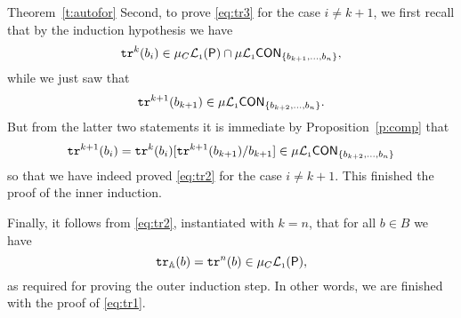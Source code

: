 \begin{proofof}{Theorem~\ref{t:autofor}}
Second, to prove \eqref{eq:tr3} for the case $i \neq k+1$, we first 
recall that by the induction hypothesis we have
\[
\mathtt{tr}^{k}(b_{i}) \in \mu_{C}\mathcal{L}_{\scriptscriptstyle 1}(\mathsf{P}) \cap 
    \mu\mathcal{L}_{\scriptscriptstyle 1}\mathsf{CON}_{\{ b_{k+1},\ldots,b_{n}\}},
\]
while we just saw that 
\[
\mathtt{tr}^{k+1}(b_{k+1}) \in \mu\mathcal{L}_{\scriptscriptstyle 1}\mathsf{CON}_{\{ b_{k+2},\ldots,b_{n}\}}.
\]
But from the latter two statements it is immediate by Proposition~\ref{p:comp} 
that 
\[
\mathtt{tr}^{k+1}(b_{i}) = \mathtt{tr}^{k}(b_{i})[\mathtt{tr}^{k+1}(b_{k+1})/b_{k+1}] 
\in \mu\mathcal{L}_{\scriptscriptstyle 1}\mathsf{CON}_{\{ b_{k+2},\ldots,b_{n}\}}
\]
so that we have indeed proved \eqref{eq:tr2} for the case $i \neq 
k+1$.
This finished the proof of the inner induction.

Finally, it follows from \eqref{eq:tr2}, instantiated with $k = n$, 
that for all $b \in B$ we have
\[
\mathtt{tr}_{\mathbb{A}}(b) = \mathtt{tr}^{n}(b) \in \mu_{C}\mathcal{L}_{\scriptscriptstyle 1}(\mathsf{P}),
\]
as required for proving the outer induction step.
In other words, we are finished with the proof of \eqref{eq:tr1}.
\end{proofof}


